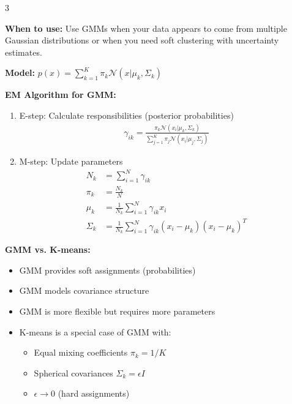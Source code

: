 \documentclass[10pt,landscape]{article}
\begin{document}
\begin{multicols}{3}
\begin{tcolorbox}[breakable, title=6.2 Gaussian Mixture Models (GMM), colback=mixture,boxsep=1pt,left=1pt,right=1pt,top=1pt,bottom=1pt]
\textbf{When to use:} Use GMMs when your data appears to come from multiple Gaussian distributions or when you need soft clustering with uncertainty estimates.

\textbf{Model:} $p(x) = \sum_{k=1}^K \pi_k \mathcal{N}(x|\mu_k, \Sigma_k)$

\textbf{EM Algorithm for GMM:}
\begin{enumerate}[leftmargin=*,noitemsep,topsep=0pt]
    \item E-step: Calculate responsibilities (posterior probabilities)
    \begin{align}
    \gamma_{ik} = \frac{\pi_k \mathcal{N}(x_i|\mu_k, \Sigma_k)}{\sum_{j=1}^K \pi_j \mathcal{N}(x_i|\mu_j, \Sigma_j)}
    \end{align}
    
    \item M-step: Update parameters
    \begin{align}
    N_k &= \sum_{i=1}^N \gamma_{ik}\\
    \pi_k &= \frac{N_k}{N}\\
    \mu_k &= \frac{1}{N_k}\sum_{i=1}^N \gamma_{ik}x_i\\
    \Sigma_k &= \frac{1}{N_k}\sum_{i=1}^N \gamma_{ik}(x_i - \mu_k)(x_i - \mu_k)^T
    \end{align}
\end{enumerate}

\textbf{GMM vs. K-means:}
\begin{itemize}[leftmargin=*,noitemsep,topsep=0pt]
    \item GMM provides soft assignments (probabilities)
    \item GMM models covariance structure
    \item GMM is more flexible but requires more parameters
    \item K-means is a special case of GMM with:
    \begin{itemize}[leftmargin=*,noitemsep]
        \item Equal mixing coefficients $\pi_k = 1/K$
        \item Spherical covariances $\Sigma_k = \epsilon I$
        \item $\epsilon \to 0$ (hard assignments)
    \end{itemize}
\end{itemize}


\end{tcolorbox}
\end{multicols}
\end{document}
